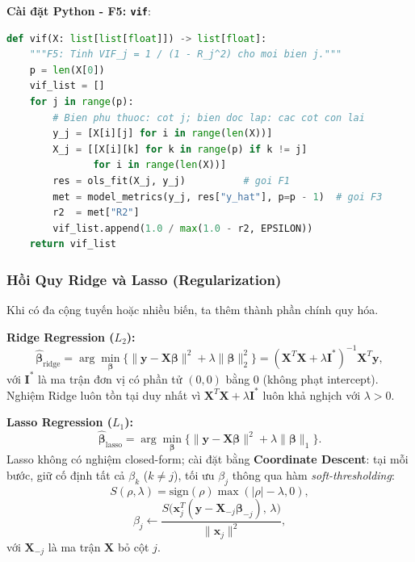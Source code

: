 \textbf{Cài đặt Python - F5: \texttt{vif}}:

\begin{lstlisting}[language=Python, caption={Hàm \texttt{vif} - tính VIF cho từng biến, dùng F1 và F3}]
def vif(X: list[list[float]]) -> list[float]:
    """F5: Tinh VIF_j = 1 / (1 - R_j^2) cho moi bien j."""
    p = len(X[0])
    vif_list = []
    for j in range(p):
        # Bien phu thuoc: cot j; bien doc lap: cac cot con lai
        y_j = [X[i][j] for i in range(len(X))]
        X_j = [[X[i][k] for k in range(p) if k != j]
               for i in range(len(X))]
        res = ols_fit(X_j, y_j)          # goi F1
        met = model_metrics(y_j, res["y_hat"], p=p - 1)  # goi F3
        r2  = met["R2"]
        vif_list.append(1.0 / max(1.0 - r2, EPSILON))
    return vif_list
\end{lstlisting}

\subsubsection{Hồi Quy Ridge và Lasso (Regularization)}

Khi có đa cộng tuyến hoặc nhiều biến, ta thêm thành phần chính quy hóa.

\medskip
\noindent\textbf{Ridge Regression ($L_2$):}
\begin{equation}
    \hat{\boldsymbol{\beta}}_{\mathrm{ridge}}
    = \arg\min_{\boldsymbol{\beta}} \bigl\{
        \|\mathbf{y} - \mathbf{X}\boldsymbol{\beta}\|^2
        + \lambda\|\boldsymbol{\beta}\|_2^2
      \bigr\}
    = (\mathbf{X}^T\mathbf{X} + \lambda\mathbf{I}^*)^{-1}\mathbf{X}^T\mathbf{y},
    \label{eq:ridge}
\end{equation}
với $\mathbf{I}^*$ là ma trận đơn vị có phần tử $(0,0)$ bằng 0 (không
phạt intercept). Nghiệm Ridge luôn tồn tại duy nhất vì
$\mathbf{X}^T\mathbf{X} + \lambda\mathbf{I}^*$ luôn khả nghịch với
$\lambda > 0$.

\medskip
\noindent\textbf{Lasso Regression ($L_1$):}
\begin{equation}
    \hat{\boldsymbol{\beta}}_{\mathrm{lasso}}
    = \arg\min_{\boldsymbol{\beta}} \bigl\{
        \|\mathbf{y} - \mathbf{X}\boldsymbol{\beta}\|^2
        + \lambda\|\boldsymbol{\beta}\|_1
      \bigr\}.
    \label{eq:lasso}
\end{equation}
Lasso không có nghiệm closed-form; cài đặt bằng \textbf{Coordinate Descent}:
tại mỗi bước, giữ cố định tất cả $\beta_k$ ($k \neq j$), tối ưu
$\beta_j$ thông qua hàm \emph{soft-thresholding}:
\begin{equation}
    S(\rho, \lambda) = \mathrm{sign}(\rho)\max(|\rho| - \lambda, 0),
    \label{eq:soft_threshold}
\end{equation}
\begin{equation}
    \beta_j \leftarrow
    \frac{S\!\bigl(\mathbf{x}_j^T(\mathbf{y} - \mathbf{X}_{-j}\boldsymbol{\beta}_{-j}),\, \lambda\bigr)}
         {\|\mathbf{x}_j\|^2},
    \label{eq:coord_descent}
\end{equation}
với $\mathbf{X}_{-j}$ là ma trận $\mathbf{X}$ bỏ cột $j$.

